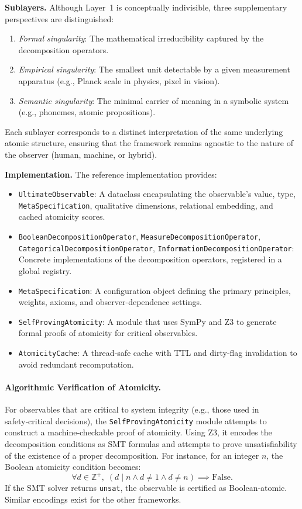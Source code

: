 \textbf{Sublayers.} Although Layer~1 is conceptually indivisible, three supplementary perspectives are distinguished:
\begin{enumerate}[label=(\roman*)]
    \item \textit{Formal singularity}: The mathematical irreducibility captured by the decomposition operators.
    \item \textit{Empirical singularity}: The smallest unit detectable by a given measurement apparatus (e.g., Planck scale in physics, pixel in vision).
    \item \textit{Semantic singularity}: The minimal carrier of meaning in a symbolic system (e.g., phonemes, atomic propositions).
\end{enumerate}
Each sublayer corresponds to a distinct interpretation of the same underlying atomic structure, ensuring that the framework remains agnostic to the nature of the observer (human, machine, or hybrid).

\textbf{Implementation.} The reference implementation provides:
\begin{itemize}
    \item \texttt{UltimateObservable}: A dataclass encapsulating the observable's value, type, \texttt{MetaSpecification}, qualitative dimensions, relational embedding, and cached atomicity scores.
    \item \texttt{BooleanDecompositionOperator}, \texttt{MeasureDecompositionOperator}, \texttt{CategoricalDecompositionOperator}, \texttt{InformationDecompositionOperator}: Concrete implementations of the decomposition operators, registered in a global registry.
    \item \texttt{MetaSpecification}: A configuration object defining the primary principles, weights, axioms, and observer-dependence settings.
    \item \texttt{SelfProvingAtomicity}: A module that uses SymPy and Z3 to generate formal proofs of atomicity for critical observables.
    \item \texttt{AtomicityCache}: A thread‑safe cache with TTL and dirty‑flag invalidation to avoid redundant recomputation.
\end{itemize}

\paragraph{Algorithmic Verification of Atomicity.}
For observables that are critical to system integrity (e.g., those used in safety‑critical decisions), the \texttt{SelfProvingAtomicity} module attempts to construct a machine‑checkable proof of atomicity. Using Z3, it encodes the decomposition conditions as SMT formulas and attempts to prove unsatisfiability of the existence of a proper decomposition. For instance, for an integer $n$, the Boolean atomicity condition becomes:
\[
\forall d \in \mathbb{Z}^+,\; (d \mid n \land d \neq 1 \land d \neq n) \implies \text{False}.
\]
If the SMT solver returns \texttt{unsat}, the observable is certified as Boolean‑atomic. Similar encodings exist for the other frameworks.

